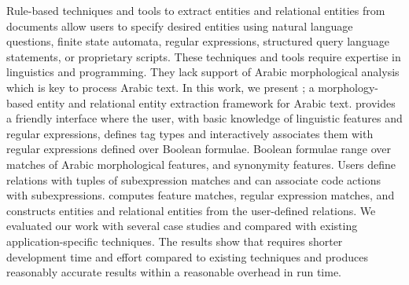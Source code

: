 Rule-based techniques and tools to extract entities and relational entities from documents allow users to specify desired entities using natural language questions, finite state automata, regular expressions, structured query language statements, or proprietary scripts.
These techniques and tools require expertise in linguistics and programming.
They lack support of Arabic morphological analysis which is key to 
process Arabic text.
In this work, we present \framework; a morphology-based entity and relational entity extraction framework for Arabic text.
\framework provides a friendly interface where the user, with basic knowledge of linguistic features and regular expressions, defines tag types and interactively associates them with regular expressions defined over Boolean formulae.
Boolean formulae range over matches of Arabic morphological features, and synonymity features.
Users define relations with tuples of subexpression matches and can associate code actions with subexpressions.
\framework computes feature matches, regular expression matches, and constructs entities and relational entities from the user-defined relations.
We evaluated our work with several case studies and compared with existing application-specific techniques.
The results show that \framework requires shorter development time and effort compared to existing techniques and produces reasonably accurate results within a reasonable overhead in run time.